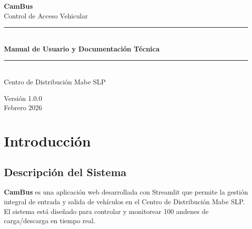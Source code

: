 \documentclass[12pt,a4paper]{article}
\begin{document}
\begin{titlepage}
    \centering
    \vspace*{2cm}
    
    {\Huge\bfseries\color{mabe-blue} CamBus}\\[0.5cm]
    {\LARGE Control de Acceso Vehicular}\\[1cm]
    
    \rule{\textwidth}{0.5pt}\\[0.5cm]
    {\Large\bfseries Manual de Usuario y Documentación Técnica}\\[0.3cm]
    \rule{\textwidth}{0.5pt}\\[2cm]
    
    {\large Centro de Distribución Mabe SLP}\\[3cm]
    
    
    \vfill
    
    {\large Versión 1.0.0}\\[0.5cm]
    {\large Febrero 2026}
    
\end{titlepage}

\tableofcontents
\newpage

\section{Introducción}

\subsection{Descripción del Sistema}

\textbf{CamBus} es una aplicación web desarrollada con Streamlit que permite la gestión integral de entrada y salida de vehículos en el Centro de Distribución Mabe SLP. El sistema está diseñado para controlar y monitorear 100 andenes de carga/descarga en tiempo real.
\end{document}
